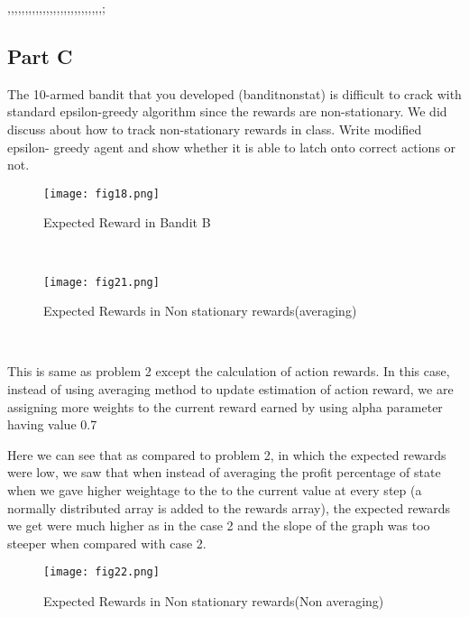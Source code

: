 ,,,,,,,,,,,,,,,,,,,,,,,,,,,;\documentclass[conference]{IEEEtran}
\begin{document}
\subsection{Part C}
\par  The 10-armed bandit that you developed (banditnonstat) is
difficult to crack with standard epsilon-greedy algorithm since
the rewards are non-stationary. We did discuss about how to
track non-stationary rewards in class. Write modified epsilon-
greedy agent and show whether it is able to latch onto correct
actions or not.
\\
\begin{figure}[htbp]
\centerline{\texttt{[image: fig18.png]}}
\caption{Expected Reward in Bandit B}
\label{figure}
\end{figure}
\\
\begin{figure}[htbp]
\centerline{\texttt{[image: fig21.png]}}
\caption{Expected Rewards in Non stationary rewards(averaging)}
\label{figure}
\end{figure}
\\
\par This is same as problem 2 except the calculation of action
rewards. In this case, instead of using averaging method to
update estimation of action reward, we are assigning more
weights to the current reward earned by using alpha parameter
having value 0.7
\par  Here we can see that as compared to problem 2, in which
the expected rewards were low, we saw that when instead of
averaging the profit percentage of state when we gave higher
weightage to the to the current value at every step (a normally
distributed array is added to the rewards array), the expected
rewards we get were much higher as in the case 2 and the
slope of the graph was too steeper when compared with case
2.
\\
\begin{figure}[htbp]
\centerline{\texttt{[image: fig22.png]}}
\caption{Expected Rewards in Non stationary rewards(Non averaging)}
\label{figure}
\end{figure}
\\
\end{document}
